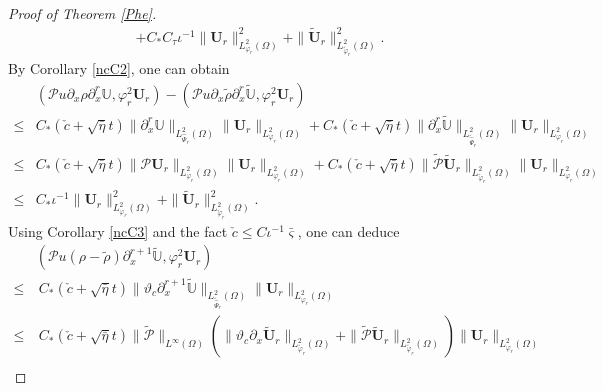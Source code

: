 \documentclass{amsart}
\numberwithin{equation}{section}
\begin{document}
\begin{proof}[Proof of Theorem \ref{Phe}]
\begin{align}
     +C_{*}C_{\tau}\iota^{-1}\|\mathbf{U}_{r}\|_{L_{\varphi_{r}}^{2}(\Omega)}^{2}
     +\|\tilde{\mathbf{U}}_{r}\|_{L_{\tilde{\varphi}_{r}}^{2}(\Omega)}^{2}.\nonumber
\end{align}
By Corollary \ref{ncC2}, one can obtain
\begin{align}\label{JJ112}
&(\mathcal{P}u\partial_{x}\rho\partial_{x}^{r}\mathbb{U},\varphi_{r}^{2}\mathbf{U}_{r})
-(\mathcal{P}u\partial_{x}\tilde{\rho}\partial_{x}^{r}\tilde{\mathbb{U}},\varphi_{r}^{2}\mathbf{U}_{r})\\
\leq& C_{*}(\check{c}+\sqrt{\bar{\eta}}t)\|\partial_{x}^{r}\mathbb{U}\|_{L_{\hat{\Psi}_{r}}^{2}(\Omega)}
                                             \|\mathbf{U}_{r}\|_{L_{\varphi_{r}}^{2}(\Omega)}
     +C_{*}(\check{c}+\sqrt{\bar{\eta}}t)\|\partial_{x}^{r}\tilde{\mathbb{U}}\|_{L_{\tilde{\hat{\Psi}}_{r}}^{2}(\Omega)}
                                             \|\mathbf{U}_{r}\|_{L_{\varphi_{r}}^{2}(\Omega)}\nonumber\\
\leq& C_{*}(\check{c}+\sqrt{\bar{\eta}}t)\|\mathcal{P}\mathbf{U}_{r}\|_{L_{\varphi_{r}}^{2}(\Omega)}
                                             \|\mathbf{U}_{r}\|_{L_{\varphi_{r}}^{2}(\Omega)}
     +C_{*}(\check{c}+\sqrt{\bar{\eta}}t)\|\tilde{\mathcal{P}}\tilde{\mathbf{U}}_{r}\|_{L_{\tilde{\varphi}_{r}}^{2}(\Omega)}
                                             \|\mathbf{U}_{r}\|_{L_{\varphi_{r}}^{2}(\Omega)}\nonumber\\
\leq& C_{*}\iota^{-1}\|\mathbf{U}_{r}\|_{L_{\varphi_{r}}^{2}(\Omega)}^{2}
     +\|\tilde{\mathbf{U}}_{r}\|_{L_{\tilde{\varphi}_{r}}^{2}(\Omega)}^{2}.\nonumber
\end{align}
Using Corollary \ref{ncC3} and the fact $\check{c}\leq C\iota^{-1}\bar{\varsigma}$, one can deduce
\begin{align}\label{JJ113}
&(\mathcal{P}u(\rho-\tilde{\rho})\partial_{x}^{r+1}\tilde{\mathbb{U}},\varphi_{r}^{2}\mathbf{U}_{r})\\
\leq&~C_{*}(\check{c}+\sqrt{\bar{\eta}}t)
           \|\vartheta_{c}\partial_{x}^{r+1}\tilde{\mathbb{U}}\|_{L_{\tilde{\hat{\Psi}}_{r}}^{2}(\Omega)}
           \|\mathbf{U}_{r}\|_{L_{\varphi_{r}}^{2}(\Omega)}\nonumber\\
\leq&~C_{*}(\check{c}+\sqrt{\bar{\eta}}t)\|\tilde{\mathcal{P}}\|_{L^{\infty}(\Omega)}
           \left(\|\vartheta_{c}\partial_{x}\tilde{\mathbf{U}}_{r}\|_{L_{\tilde{\varphi}_{r}}^{2}(\Omega)}
                 +\|\tilde{\mathcal{P}}\tilde{\mathbf{U}}_{r}\|_{L_{\tilde{\varphi}_{r}}^{2}(\Omega)}\right)
      \|\mathbf{U}_{r}\|_{L_{\varphi_{r}}^{2}(\Omega)}\nonumber\\

\end{align}
\end{proof}
\end{document}
